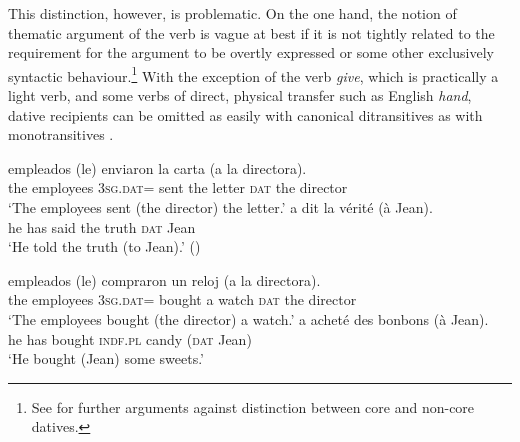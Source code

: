 \documentclass[output=paper,colorlinks,citecolor=brown,modfonts,nonflat]{langsci/langscibook}
\begin{document}
This distinction, however, is problematic. On the one hand, the notion of thematic argument of the verb is vague at best if it is not tightly related to the requirement for the argument to be overtly expressed or some other exclusively syntactic behaviour.\footnote{See \citet{FernándezAlcalde2014} for further arguments against  distinction between core and non-core datives.}  With the exception of the verb \textit{give}, which is practically a light verb, and some verbs of direct, physical transfer such as English \textit{hand}, dative recipients can be omitted as easily with canonical ditransitives  as with monotransitives .

\ea%
    \label{ex:cuervo:1}
    \ea%
        \label{ex:cuervo:1a}
         {empleados} {(le)}  {enviaron}  {la} {carta} {(a} {la} {directora).}\\
             the employees {3\textsc{sg.dat}=} sent        the letter \textsc{dat} the director\\
        \glt ‘The employees sent (the director) the letter.’
    \ex%
        \label{ex:cuervo:1b}
         {a} {dit} {la} {vérité} {(à} {Jean)}.\\
        he has said the truth \textsc{dat} Jean\\
        \glt ‘He told the truth (to Jean).’  (\citealt{BonehNash2012})
    \z
\z



\ea%
    \label{ex:cuervo:2}
    \ea%
        \label{ex:cuervo:2a}
         {empleados} {(le)} {compraron} {un} {reloj} {(a} {la} {directora)}.\\
                   the employees {\textsc{3sg.dat}=} bought a watch \textsc{dat} the director\\
        \glt ‘The employees bought (the director) a watch.’
    \ex%
        \label{ex:cuervo:2b}
         {a} {acheté} {des} {bonbons} {(à} {Jean)}.\\
        he has bought {\textsc{indf.pl}} candy (\textsc{dat} Jean)\\
        \glt ‘He bought (Jean) some sweets.’
    \z
\z
\end{document}

